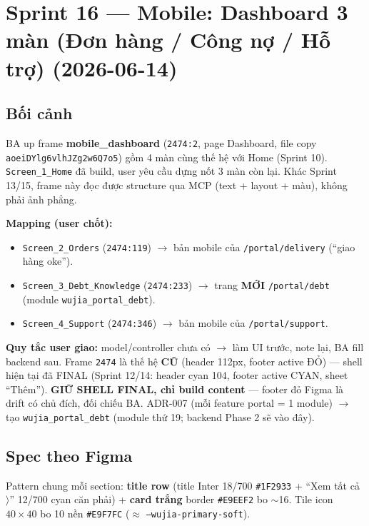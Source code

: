\chapter{Sprint 16 --- Mobile: Dashboard 3 màn (Đơn hàng / Công nợ / Hỗ trợ) (2026-06-14)}

\section{Bối cảnh}

BA up frame \textbf{mobile\_dashboard} (\texttt{2474:2}, page Dashboard, file copy
\texttt{aoeiDYlg6vlhJZg2w6Q7o5}) gồm 4 màn cùng thế hệ với Home (Sprint 10).
\texttt{Screen\_1\_Home} đã build, user yêu cầu dựng nốt 3 màn còn lại. Khác Sprint
13/15, frame này đọc được structure qua MCP (text + layout + màu), không phải ảnh
phẳng.

\textbf{Mapping (user chốt):}
\begin{itemize}
  \item \texttt{Screen\_2\_Orders} (\texttt{2474:119}) \(\rightarrow\) bản mobile của
        \texttt{/portal/delivery} (``giao hàng oke'').
  \item \texttt{Screen\_3\_Debt\_Knowledge} (\texttt{2474:233}) \(\rightarrow\) trang
        \textbf{MỚI} \texttt{/portal/debt} (module \texttt{wujia\_portal\_debt}).
  \item \texttt{Screen\_4\_Support} (\texttt{2474:346}) \(\rightarrow\) bản mobile của
        \texttt{/portal/support}.
\end{itemize}

\textbf{Quy tắc user giao:} model/controller chưa có \(\rightarrow\) làm UI trước, note
lại, BA fill backend sau. Frame \texttt{2474} là thế hệ \textbf{CŨ} (header 112px,
footer active ĐỎ) --- shell hiện tại đã FINAL (Sprint 12/14: header cyan 104, footer
active CYAN, sheet ``Thêm''). \textbf{GIỮ SHELL FINAL, chỉ build content} --- footer
đỏ Figma là drift có chủ đích, đối chiếu BA. ADR-007 (mỗi feature portal = 1 module)
\(\rightarrow\) tạo \texttt{wujia\_portal\_debt} (module thứ 19; backend Phase 2 sẽ
vào đây).

\section{Spec theo Figma}

Pattern chung mỗi section: \textbf{title row} (title Inter 18/700 \texttt{\#1F2933} +
``Xem tất cả \(\rangle\)'' 12/700 cyan căn phải) + \textbf{card trắng} border
\texttt{\#E9EEF2} bo \(\sim\)16. Tile icon \(40\times40\) bo 10 nền \texttt{\#E9F7FC}
(\(\approx\) \texttt{--wujia-primary-soft}).

